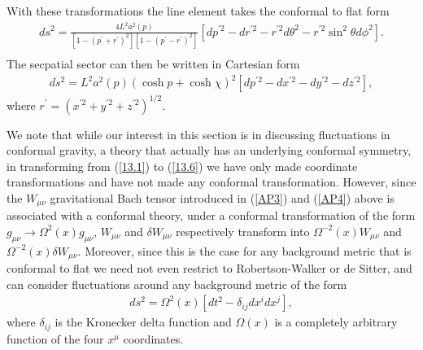 %
With these transformations the line element takes the conformal to flat form
%
\begin{eqnarray}
ds^2=\frac{4L^2a^2(p)}{[1-(p^{\prime}+r^{\prime})^2][1-(p^{\prime}-r^{\prime})^2]}\left[dp^{\prime 2}-dr^{\prime 2} -r^{\prime 2}d\theta^2-r^{\prime 2} \sin^2\theta d\phi^2\right].
\nonumber\\
\label{13.5}
\end{eqnarray}
%
The secpatial sector can then be written in Cartesian form
%
\begin{eqnarray}
ds^2=L^2a^2(p)(\cosh p+\cosh \chi)^2\left[dp^{\prime 2}-dx^{\prime 2} -dy^{\prime 2} -dz^{\prime 2}\right],
\label{13.6}
\end{eqnarray}
%
where $r^{\prime}=(x^{\prime 2}+ y^{\prime 2}+z^{\prime 2})^{1/2}$.  

We note that while our interest in this section is in discussing fluctuations in conformal gravity, a theory that actually has an underlying conformal symmetry, in transforming from (\ref{13.1})  to (\ref{13.6}) we have only made coordinate transformations and have not made any conformal transformation. However, since the $W_{\mu\nu}$ gravitational Bach tensor introduced in (\ref{AP3}) and (\ref{AP4}) above is associated with a conformal theory, under a conformal transformation of the form $g_{\mu\nu}\rightarrow \Omega^{2}(x)g_{\mu\nu}$, $W_{\mu\nu}$ and $\delta W_{\mu\nu}$ respectively transform into $\Omega^{-2}(x)W_{\mu\nu}$ and $\Omega^{-2}(x)\delta W_{\mu\nu}$. Moreover, since this is the case for any background metric that is conformal to flat we need not even restrict to Robertson-Walker or de Sitter, and can consider fluctuations around any background metric of the form 
%
\begin{eqnarray}
ds^2=\Omega^2(x)[dt^2-\delta_{ij}dx^idx^j],
\label{13.7}
\end{eqnarray}
%
where $\delta_{ij}$ is the Kronecker delta function and $\Omega(x)$ is a completely arbitrary function of the four $x^{\mu}$ coordinates.

